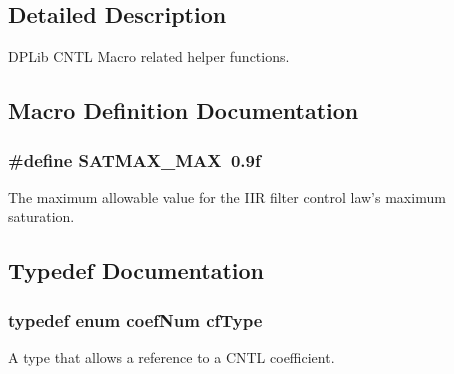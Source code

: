 \subsection{Detailed Description}
D\-P\-Lib C\-N\-T\-L Macro related helper functions. 

\subsection{Macro Definition Documentation}
\hypertarget{a00010_a64fd24fd8ffc66895ab057370d1c10f9}{
\subsubsection[{S\-A\-T\-M\-A\-X\-\_\-\-M\-A\-X}]{\setlength{\rightskip}{0pt plus 5cm}\#define S\-A\-T\-M\-A\-X\-\_\-\-M\-A\-X~0.\-9f}}\label{a00010_a64fd24fd8ffc66895ab057370d1c10f9}
The maximum allowable value for the I\-I\-R filter control law's maximum saturation. 

\subsection{Typedef Documentation}
\hypertarget{a00010_ac340fbbc5919954c173757935549588f}{
\subsubsection[{cf\-Type}]{\setlength{\rightskip}{0pt plus 5cm}typedef enum {\bf coef\-Num} {\bf cf\-Type}}}\label{a00010_ac340fbbc5919954c173757935549588f}
A type that allows a reference to a C\-N\-T\-L coefficient. 

